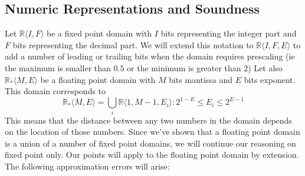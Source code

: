 \documentclass[runningheads,a4paper]{llncs}
\begin{document}
\subsection{Numeric Representations and Soundness} \label{sec:numeric_rep}

Let $\mathbb{R} \langle I,F \rangle$ be a fixed point domain with $I$ bits representing the integer part and $F$ bits
representing the decimal part. We will extend this notation to $\mathbb{R} \langle I,F,E \rangle$ to add a number of
leading or trailing bits when the domain requires prescaling (ie the maximum is smaller than $0.5$ or the minimum
is greater than $2$)
Let also $\mathbb{R}_* \langle M,E \rangle$ be a floating point domain with $M$ bits
mantissa and $E$ bits exponent. This domain corresponds to 
$$\mathbb{R}_* \langle M,E \rangle = \bigcup_i \mathbb{R} \langle 1,M-1,E_i \rangle : 2^{1-E} \leq E_i  \leq 2^{E-1}$$
This means that the distance between any two numbers in the domain depends on the
location of those numbers.
Since we've shown that a floating point domain is a union of a number of fixed point domains, we will continue our
reasoning on fixed point only. Our points will apply to the floating point domain by extension.
The following approximation errors will arise:
\end{document}
